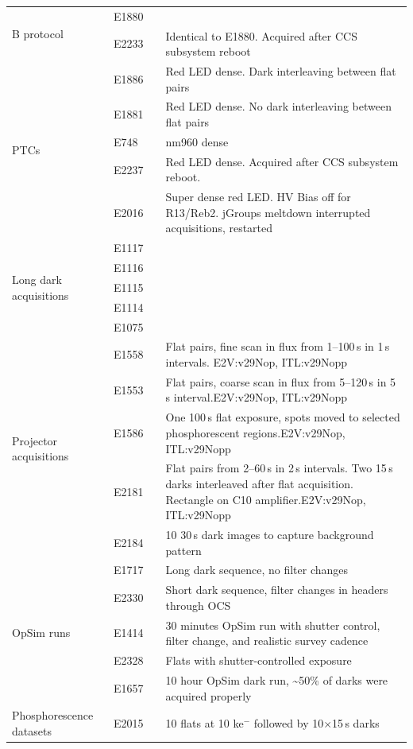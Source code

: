 \begin{longtable}{|p{2cm}|p{2cm}|p{2cm}|p{10cm}|}
\multirow{2}{=}{B protocol} & E1880 & & \\
& E2233 & & Identical to E1880. Acquired after CCS subsystem reboot \\ \hline
\multirow{5}{=}{PTCs} & E1886 & & Red LED dense. Dark interleaving between flat pairs \\ 
& E1881 & & Red LED dense. No dark interleaving between flat pairs \\ \hline
& E748 & & nm960 dense \\ \hline
& E2237 & & Red LED dense. Acquired after CCS subsystem reboot. \\ \hline
& E2016 & & Super dense red LED. HV Bias off for R13/Reb2. jGroups meltdown interrupted acquisitions, restarted \\ \hline
\multirow{5}{=}{Long dark acquisitions} & E1117 & & \\
& E1116 & & \\ \hline
& E1115 & & \\ \hline
& E1114 & & \\ \hline
& E1075 & & \\ \hline
\multirow{5}{=}{Projector acquisitions} & E1558 & & Flat pairs, fine scan in flux from 1--100\,s in 1\,s intervals. E2V:v29Nop, ITL:v29Nopp \\
& E1553 & & Flat pairs, coarse scan in flux from 5--120\,s in 5\,s
interval.E2V:v29Nop,
ITL:v29Nopp \\ \hline
& E1586 & & One 100\,s flat exposure, spots moved to selected
phosphorescent regions.E2V:v29Nop,
ITL:v29Nopp \\ \hline
& E2181 & & Flat pairs from 2--60\,s in 2\,s intervals. Two 15\,s darks
interleaved after flat acquisition. Rectangle on C10
amplifier.E2V:v29Nop,
ITL:v29Nopp \\ \hline
& E2184 & & 10 30\,s dark images to capture background pattern \\ \hline
\multirow{5}{=}{OpSim runs} & E1717 & & Long dark sequence, no filter
changes \\ 
& E2330 & & Short dark sequence, filter changes in headers through
OCS \\ \hline
& E1414 & & 30 minutes OpSim run with shutter control, filter change,
and realistic survey cadence \\ \hline
& E2328 & & Flats with shutter-controlled exposure \\ \hline
& E1657 & & 10 hour OpSim dark run, \textasciitilde50\% of darks were
acquired properly \\ \hline
\multirow{5}{=}{Phosphorescence datasets} & E2015 & & 10 flats at 10 ke$^-$ followed by 10$\times$15\,s darks \\ 

\end{longtable}
